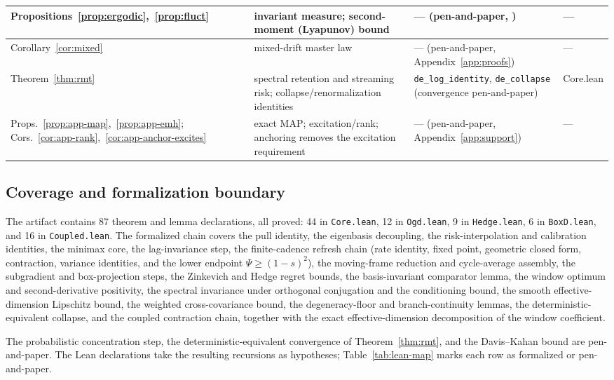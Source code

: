 {\begin{longtable}{@{}p{1.02in} p{1.12in} p{1.9in} l@{}}
Propositions~\ref{prop:ergodic},~\ref{prop:fluct} & invariant measure; second-moment (Lyapunov) bound & --- (pen-and-paper, \citealp{meyn2009}) & --- \\
\midrule
Corollary~\ref{cor:mixed} & mixed-drift master law & --- (pen-and-paper, Appendix~\ref{app:proofs}) & --- \\
Theorem~\ref{thm:rmt} & spectral retention and streaming risk; collapse/renormalization identities & \texttt{de\_log\_identity}, \texttt{de\_collapse} (convergence pen-and-paper) & Core.lean \\
Props.~\ref{prop:app-map},~\ref{prop:app-emh}; Cors.~\ref{cor:app-rank},~\ref{cor:app-anchor-excites} & exact MAP; excitation/rank; anchoring removes the excitation requirement & --- (pen-and-paper, Appendix~\ref{app:support}) & --- \\
\end{longtable}}

\subsection{Coverage and formalization boundary}
The artifact contains 87 theorem and lemma declarations, all proved: 44 in \texttt{Core.lean}, 12 in \texttt{Ogd.lean}, 9 in \texttt{Hedge.lean}, 6 in \texttt{BoxD.lean}, and 16 in \texttt{Coupled.lean}.
The formalized chain covers the pull identity, the eigenbasis decoupling, the risk-interpolation and calibration identities, the minimax core, the lag-invariance step, the finite-cadence refresh chain (rate identity, fixed point, geometric closed form, contraction, variance identities, and the lower endpoint $\Psi \ge (1-s)^2$), the moving-frame reduction and cycle-average assembly, the subgradient and box-projection steps, the Zinkevich and Hedge regret bounds, the basis-invariant comparator lemma, the window optimum and second-derivative positivity, the spectral invariance under orthogonal conjugation and the conditioning bound, the smooth effective-dimension Lipschitz bound, the weighted cross-covariance bound, the degeneracy-floor and branch-continuity lemmas, the deterministic-equivalent collapse, and the coupled contraction chain, together with the exact effective-dimension decomposition of the window coefficient.

The probabilistic concentration step, the deterministic-equivalent convergence of Theorem~\ref{thm:rmt}, and the Davis--Kahan bound are pen-and-paper.
The Lean declarations take the resulting recursions as hypotheses; Table~\ref{tab:lean-map} marks each row as formalized or pen-and-paper.

